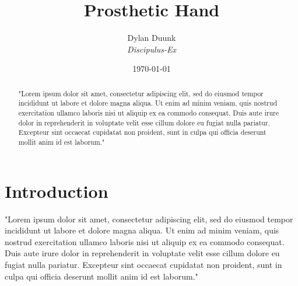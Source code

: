 \documentclass[a4paper]{article}
\title{\Huge{Prosthetic Hand} }
\author{Dylan Duunk \\ \textit{Discipulus-Ex} }
\date{\today}
\begin{document}
\begin{titlepage}
    \maketitle
\end{titlepage}

\listoftodos[TODO]

\newpage

\begin{abstract}
    \noindent 
    "Lorem ipsum dolor sit amet, consectetur adipiscing elit, sed do eiusmod tempor incididunt ut labore et dolore magna aliqua. 
    Ut enim ad minim veniam, quis nostrud exercitation ullamco laboris nisi ut aliquip ex ea commodo consequat. 
    Duis aute irure dolor in reprehenderit in voluptate velit esse cillum dolore eu fugiat nulla pariatur. 
    Excepteur sint occaecat cupidatat non proident, sunt in culpa qui officia deserunt mollit anim id est laborum."
\end{abstract}

\newpage
\tableofcontents
\newpage
{}

\section{Introduction}
"Lorem ipsum dolor sit amet, consectetur adipiscing elit, sed do eiusmod tempor incididunt ut labore et dolore magna aliqua. 
Ut enim ad minim veniam, quis nostrud exercitation ullamco laboris nisi ut aliquip ex ea commodo consequat. 
Duis aute irure dolor in reprehenderit in voluptate velit esse cillum dolore eu fugiat nulla pariatur. 
Excepteur sint occaecat cupidatat non proident, sunt in culpa qui officia deserunt mollit anim id est laborum."

\newpage


\end{document}
